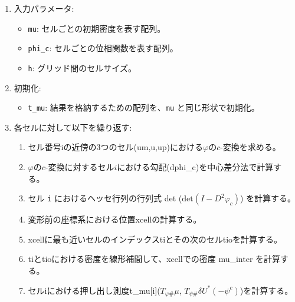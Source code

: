 \begin{enumerate}
    \item 入力パラメータ:
    \begin{itemize}
        \item \texttt{mu}: セルごとの初期密度を表す配列。
        \item \texttt{phi\_c}: セルごとの位相関数を表す配列。
        \item \texttt{h}: グリッド間のセルサイズ。
    \end{itemize}

    \item 初期化:
    \begin{itemize}
        \item \texttt{t\_mu}: 結果を格納するための配列を、\texttt{mu} と同じ形状で初期化。
    \end{itemize}

    \item 各セルに対して以下を繰り返す:
    \begin{enumerate}
        \item セル番号iの近傍の3つのセル(um,u,up)における$\varphi$の$c$-変換を求める。
        \item $\varphi$の$c$-変換に対するセル$i$における勾配(dphi\_c)を中心差分法で計算する。
        \item セル \texttt{i} におけるヘッセ行列の行列式 det ($\text{det}(I - D^2\varphi_c)$) を計算する。
        \item 変形前の座標系における位置xcellの計算する。
        \item xcellに最も近いセルのインデックスtiとその次のセルtioを計算する。
        \item tiとtioにおける密度を線形補間して、xcellでの密度 mu\_inter を計算する。
        \item セルiにおける押し出し測度t\_mu[i]($T_{\varphi \#} \mu$, $T_{\psi \#} \delta U^*(- \psi^c)$)を計算する。
    \end{enumerate}

\end{enumerate}

